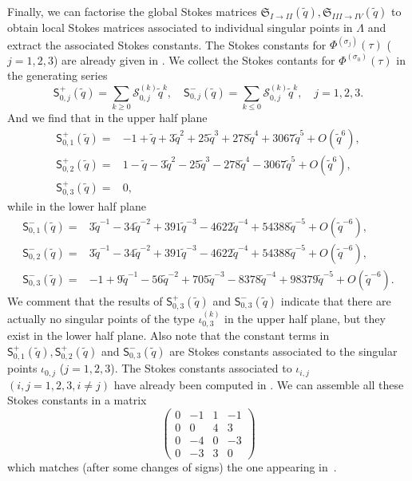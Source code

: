 \documentclass[12pt,reqno]{amsart}
\theoremstyle{definition}
\def\s{\sigma}
\def\tq{\tilde{q}}
\def\mc{\mathcal}
\def\mf{\mathfrak}
\def\ms{\mathsf}
\def\cO{O}
\begin{document}
Finally, we can factorise the global Stokes matrices
$\mf{S}_{I\rightarrow II}(\tq), \mf{S}_{III\rightarrow IV}(\tq)$ to
obtain local Stokes matrices associated to individual singular points
in $\Lambda$ and extract the associated Stokes constants.
The Stokes constants for $\Phi^{(\s_j)}(\tau)$ ($j=1,2,3$) are already given
in \cite{GGM:resurgent,GGM:peacock}.
We collect the Stokes contants for $\Phi^{(\s_0)}(\tau)$ in the
generating series
\begin{equation}
  \ms{S}^+_{0,j}(\tq) = \sum_{k\geq 0} \mc{S}^{(k)}_{0,j}\tq^k,\quad
  \ms{S}^-_{0,j}(\tq) = \sum_{k\leq 0} \mc{S}^{(k)}_{0,j}\tq^k,\quad j=1,2,3.
\end{equation}
And we find that in the upper half plane
\begin{subequations}
  \begin{align}
    \ms{S}^+_{0,1}(\tq) =
    &-1+\tq+3\tq^2+25\tq^3+278\tq^4+3067\tq^5+\cO(\tq^6),\\
    \ms{S}^+_{0,2}(\tq) =
    &1-\tq-3\tq^2-25\tq^3-278\tq^4-3067\tq^5+\cO(\tq^6),\\
    \ms{S}^+_{0,3}(\tq) =
    &0,
  \end{align}
\end{subequations}
while in the lower half plane
\begin{subequations}
  \begin{align}
    \ms{S}^-_{0,1}(\tq) =
    &3\tq^{-1}-34\tq^{-2}+391\tq^{-3}-4622\tq^{-4}
      +54388\tq^{-5}+\cO(\tq^{-6}),\\
    \ms{S}^-_{0,2}(\tq) =
    &3\tq^{-1}-34\tq^{-2}+391\tq^{-3}-4622\tq^{-4}
      +54388\tq^{-5}+\cO(\tq^{-6}),\\
    \ms{S}^-_{0,3}(\tq) =
    &-1+9\tq^{-1}-56\tq^{-2}+705\tq^{-3}-8378\tq^{-4}
      +98379\tq^{-5}+\cO(\tq^{-6}).
  \end{align}
\end{subequations}
We comment that the results of $\ms{S}^+_{0,3}(\tq)$ and
$\ms{S}^-_{0,3}(\tq)$ indicate that there are actually no singular
points of the type $\iota_{0,3}^{(k)}$ in the upper half plane, but
they exist in the lower half plane.  Also note that the constant terms
in $\ms{S}^+_{0,1}(\tq),\ms{S}^+_{0,2}(\tq)$ and $\ms{S}^-_{0,3}(\tq)$
are Stokes constants associated to the singular points $\iota_{0,j}$
($j=1,2,3$).  The Stokes constants associated to $\iota_{i,j}$
$(i,j=1,2,3, i\neq j)$ have already been computed in
\cite{GGM:resurgent,GGM:peacock}. We can assemble all these Stokes
constants in a matrix
\begin{equation}
  \begin{pmatrix}
    0&-1&1&-1\\
    0& 0&4& 3\\
    0&-4&0&-3\\
    0&-3&3& 0
  \end{pmatrix}
\end{equation}
which matches (after some changes of signs) the one appearing
in~\cite[Eq.(40)]{GZ:kashaev}.
\end{document}
